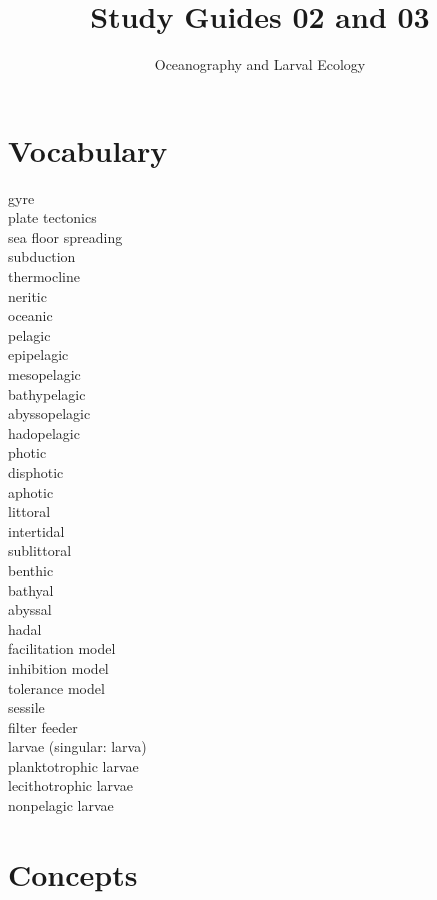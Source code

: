 \documentclass[nofonts, letterpaper]{tufte-handout}
\title{Study Guides 02 and 03}
\author{Oceanography and Larval Ecology}
\date{} %
\begin{document}
\maketitle	%


\section{Vocabulary}
\vspace{-1\baselineskip}
\begin{multicols}{2}
gyre \\
plate tectonics \\
sea floor spreading \\
subduction \\
thermocline \\
neritic \\
oceanic \\
pelagic \\
epipelagic \\
mesopelagic \\
bathypelagic \\
abyssopelagic \\
hadopelagic \\
photic \\
disphotic \\
aphotic \\
littoral \\
intertidal \\
sublittoral \\
benthic \\
bathyal \\
abyssal \\
hadal \\
facilitation model \\
inhibition model \\
tolerance model \\
sessile \\
filter feeder \\
larvae (singular: larva) \\
planktotrophic larvae \\
lecithotrophic larvae \\
nonpelagic larvae 
\end{multicols}

\section{Concepts}
\end{document}

